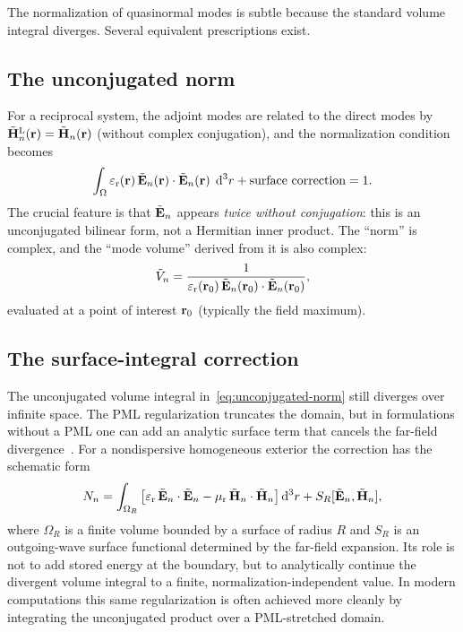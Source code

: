 The normalization of quasinormal modes is subtle because the standard
volume integral diverges. Several equivalent prescriptions exist.

\subsection{The unconjugated norm}
\label{ssec:unconjugated}

For a reciprocal system, the adjoint modes are related to the direct
modes by $\tilde{\mathbf{H}}_n^{\mathrm{L}}(\mathbf{r}) = \tilde{\mathbf{H}}_n(\mathbf{r})$
(without complex conjugation), and the normalization condition
becomes~\cite{kristensen2011effective}
\begin{equation}
 \int_\Omega \varepsilon_{\mathrm{r}}(\mathbf{r})\,\tilde{\mathbf{E}}_n(\mathbf{r})\cdot\tilde{\mathbf{E}}_n(\mathbf{r})
 \;\mathop{}\!\mathrm{d}^3 r
 + \text{surface correction}
 = 1.
 \label{eq:unconjugated-norm}
\end{equation}
The crucial feature is that $\tilde{\mathbf{E}}_n$ appears \emph{twice without
conjugation}: this is an unconjugated bilinear form, not a Hermitian
inner product. The ``norm'' is complex, and the ``mode volume'' derived
from it is also complex:
\begin{equation}
 \tilde{V}_n = \frac{1}{\varepsilon_{\mathrm{r}}(\mathbf{r}_0)\,\tilde{\mathbf{E}}_n(\mathbf{r}_0)\cdot
 \tilde{\mathbf{E}}_n(\mathbf{r}_0)},
 \label{eq:complex-mode-volume}
\end{equation}
evaluated at a point of interest $\mathbf{r}_0$ (typically the field maximum).

\subsection{The surface-integral correction}
\label{ssec:surface-correction}

The unconjugated volume integral in~\eqref{eq:unconjugated-norm} still
diverges over infinite space. The PML regularization truncates the domain,
but in formulations without a PML one can add an analytic surface term
that cancels the far-field divergence~\cite{kristensen2011effective}.
For a nondispersive homogeneous exterior the correction has the schematic
form
\begin{equation}
 N_n =
 \int_{\Omega_R}
 \left[
 \varepsilon_{\mathrm{r}}\,\tilde{\mathbf{E}}_n\cdot\tilde{\mathbf{E}}_n
 - \mu_{\mathrm{r}}\,\tilde{\mathbf{H}}_n\cdot\tilde{\mathbf{H}}_n
 \right]\mathop{}\!\mathrm{d}^3 r
 + S_R[\tilde{\mathbf{E}}_n,\tilde{\mathbf{H}}_n],
 \label{eq:surface-norm}
\end{equation}
where $\Omega_R$ is a finite volume bounded by a surface of radius $R$
and $S_R$ is an outgoing-wave surface functional determined by the
far-field expansion. Its role is not to add stored energy at the boundary,
but to analytically continue the divergent volume integral to a finite,
normalization-independent value. In modern computations this same
regularization is often achieved more cleanly by integrating the
unconjugated product over a PML-stretched domain.

